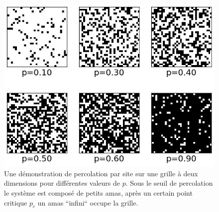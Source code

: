 \begin{figure}[h!]
	\centering
	\includegraphics[scale=0.5]{./figures/percolation}
	\caption{Une démonstration de percolation par site sur une grille à deux dimensions pour différentes valeurs de $p$. Sous le seuil de percolation le système est composé de petits amas, après un certain point critique $p_c$ un amas ``infini`` occupe la grille.}
	\label{percolation}
\end{figure}

